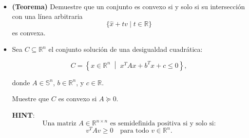 \begin{itemize}
    \item[(a)] \textbf{(Teorema)} 
Demuestre que un conjunto es convexo si y solo si su intersección con una línea arbitraria 
\[
\{ \hat{x} + t v \mid t \in \mathbb{R} \}
\]
es convexa.
    \item[(b)] Sea \( C \subseteq \mathbb{R}^n \) el conjunto solución de una desigualdad cuadrática:

\[
C = \left\{ x \in \mathbb{R}^n \;\middle|\; x^T A x + b^T x + c \leq 0 \right\},
\]

donde \( A \in \mathbb{S}^n \), \( b \in \mathbb{R}^n \), y \( c \in \mathbb{R} \).

Muestre que \( C \) es convexo si \( A \succeq 0 \).
    
    \textbf{HINT}: \[
\text{Una matriz } A \in \mathbb{R}^{n \times n} \text{ es semidefinida positiva si y solo si:}
\]
\[
v^T A v \geq 0 \quad \text{para todo } v \in \mathbb{R}^n.
\]
\end{itemize}
